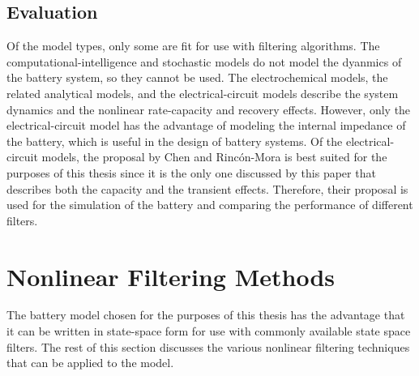 \documentclass[../zhang_thesis.tex]{subfiles}
\begin{document}
\subsection{Evaluation}

Of the model types, only some are fit for use with filtering algorithms. The computational-intelligence and stochastic models do not model the dyanmics of the battery system, so they cannot be used. The electrochemical models, the related analytical models, and the electrical-circuit models describe the system dynamics and the nonlinear rate-capacity and recovery effects. However, only the electrical-circuit model has the advantage of modeling the internal impedance of the battery,
which is useful in the design of battery systems. Of the electrical-circuit models, the proposal by Chen and Rinc\'on-Mora is best suited for the purposes of this thesis since it is the only one discussed by this paper that describes both the capacity and the transient effects. Therefore, their proposal is used for the simulation of the battery and comparing the performance of different filters.


\section{Nonlinear Filtering Methods}
\label{sec:nl_filt}

The battery model chosen for the purposes of this thesis has the advantage that it can be written in state-space form for use with commonly available state space filters. The rest of this section discusses the various nonlinear filtering techniques that can be applied to the model.
\end{document}

